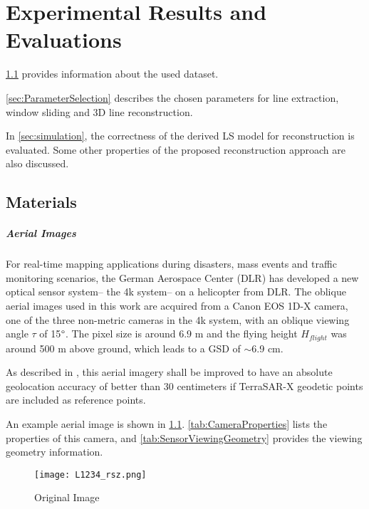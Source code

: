\chapter{Experimental Results and Evaluations}
\label{chap:k3}

\cref{sec:Materials} provides information about the used dataset. 

\cref{sec:ParameterSelection} describes the chosen parameters for line extraction, window sliding and 3D line reconstruction. 

In \cref{sec:simulation}, the correctness of the derived LS model for reconstruction is evaluated. Some other properties of the proposed reconstruction approach are also discussed.


\clearpage
\section{Materials}
\label{sec:Materials}

\paragraph{Aerial Images}
For real-time mapping applications during disasters, mass events and traffic monitoring scenarios, the German Aerospace Center (DLR) has developed a new optical sensor system-- the 4k system-- on a helicopter from DLR. The oblique aerial images used in this work are acquired from a Canon EOS 1D-X camera, one of the three non-metric cameras in the 4k system, with an oblique viewing angle $\tau$ of 15$\degree$. The pixel size is around $6.9$ \textmu m and the flying height $H_{flight}$ was around 500 m above ground, which leads to a GSD of $\sim$6.9 cm.

As described in \cite{Fischer2017}, this aerial imagery shall be improved to have an absolute geolocation accuracy of better than 30 centimeters if TerraSAR-X geodetic points are included as reference points.

An example aerial image is shown in \cref{fig:OriImg}. \cref{tab:CameraProperties} lists the properties of this camera, and \cref{tab:SensorViewingGeometry} provides the viewing geometry information.
\begin{figure}
	\centering
	\texttt{[image: L1234\_rsz.png]}
	\caption{\small Original Image}
	\label{fig:OriImg}
\end{figure}

